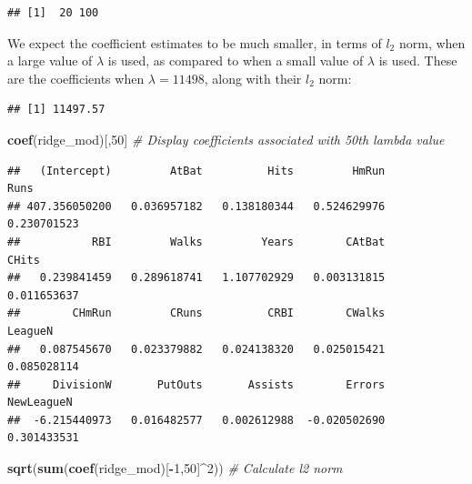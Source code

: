 \documentclass[openany]{book}
\newenvironment{Shaded}{\begin{snugshade}}{\end{snugshade}}
\newcommand{\CommentTok}[1]{\textcolor[rgb]{0.56,0.35,0.01}{\textit{#1}}}
\newcommand{\DecValTok}[1]{\textcolor[rgb]{0.00,0.00,0.81}{#1}}
\newcommand{\KeywordTok}[1]{\textcolor[rgb]{0.13,0.29,0.53}{\textbf{#1}}}
\newcommand{\NormalTok}[1]{#1}
\newcommand{\OperatorTok}[1]{\textcolor[rgb]{0.81,0.36,0.00}{\textbf{#1}}}
\begin{document}
\begin{verbatim}
## [1]  20 100
\end{verbatim}

We expect the coefficient estimates to be much smaller, in terms of \(l_2\) norm,
when a large value of \(\lambda\) is used, as compared to when a small value of \(\lambda\) is
used. These are the coefficients when \(\lambda = 11498\), along with their \(l_2\) norm:

\begin{Shaded}
\end{Shaded}

\begin{verbatim}
## [1] 11497.57
\end{verbatim}

\begin{Shaded}
\begin{Highlighting}[]
\KeywordTok{coef}\NormalTok{(ridge_mod)[,}\DecValTok{50}\NormalTok{] }\CommentTok{# Display coefficients associated with 50th lambda value}
\end{Highlighting}
\end{Shaded}

\begin{verbatim}
##   (Intercept)         AtBat          Hits         HmRun          Runs 
## 407.356050200   0.036957182   0.138180344   0.524629976   0.230701523 
##           RBI         Walks         Years        CAtBat         CHits 
##   0.239841459   0.289618741   1.107702929   0.003131815   0.011653637 
##        CHmRun         CRuns          CRBI        CWalks       LeagueN 
##   0.087545670   0.023379882   0.024138320   0.025015421   0.085028114 
##     DivisionW       PutOuts       Assists        Errors    NewLeagueN 
##  -6.215440973   0.016482577   0.002612988  -0.020502690   0.301433531
\end{verbatim}

\begin{Shaded}
\begin{Highlighting}[]
\KeywordTok{sqrt}\NormalTok{(}\KeywordTok{sum}\NormalTok{(}\KeywordTok{coef}\NormalTok{(ridge_mod)[}\OperatorTok{-}\DecValTok{1}\NormalTok{,}\DecValTok{50}\NormalTok{]}\OperatorTok{^}\DecValTok{2}\NormalTok{)) }\CommentTok{# Calculate l2 norm}
\end{Highlighting}
\end{Shaded}
\end{document}
